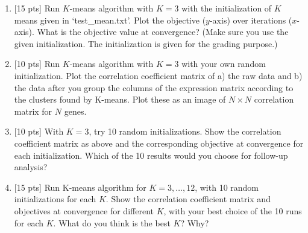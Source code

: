 \documentclass[11pt]{article}
\begin{document}
\begin{enumerate}
\begin{enumerate}
\item{[15 pts]} Run $K$-means algorithm with $K=3$ with the initialization of $K$ means given in `test\_mean.txt'. Plot the objective ($y$-axis)
over iterations ($x$-axis). What is the objective value at convergence? (Make sure you use the given initialization. The initialization is given
for the grading purpose.)

\begin{tcolorbox}[fit,height=6cm, width=15cm, blank, borderline={1pt}{-2pt},nobeforeafter]

\end{tcolorbox}

\item {[10 pts]} Run $K$-means algorithm with $K=3$ with your own random initialization. 
Plot the correlation coefficient matrix of a) the raw data
and b) the data after you group the columns of the expression matrix according to the clusters found by K-means.
Plot these as an image of $N\times N$ correlation matrix for $N$ genes.

\begin{tcolorbox}[fit,height=6cm, width=15cm, blank, borderline={1pt}{-2pt},nobeforeafter]

\end{tcolorbox}

\item {[10 pts]} With $K=3$, try 10 random initializations. Show the correlation coefficient matrix as above
and the corresponding objective at convergence for each initialization. Which of the 10 results would you choose for follow-up analysis?

\begin{tcolorbox}[fit,height=6cm, width=15cm, blank, borderline={1pt}{-2pt},nobeforeafter]

\end{tcolorbox}

\item {[15 pts]} Run K-means algorithm for $K=3,\ldots, 12$, with 10 random initializations for each $K$.
Show the correlation coefficient matrix and objectives at convergence for different $K$, with your best choice of
the 10 runs for each $K$. What do you think is the best $K$? Why?

\begin{tcolorbox}[fit,height=6cm, width=15cm, blank, borderline={1pt}{-2pt},nobeforeafter]

\end{tcolorbox}
\end{enumerate}


\end{enumerate}
\end{document}
